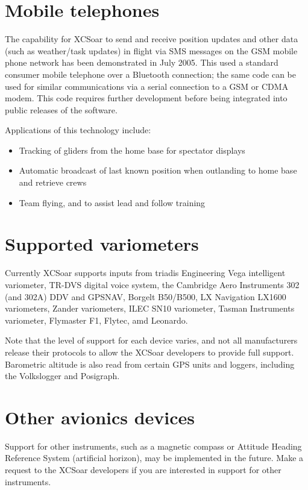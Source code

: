\documentclass[a4paper,12pt]{refrep}
\begin{document}
\section{Mobile telephones}

The capability for XCSoar to send and receive position updates and
other data (such as weather/task updates) in flight via SMS messages
on the GSM mobile phone network has been demonstrated in July 2005.
This used a standard consumer mobile telephone over a Bluetooth
connection; the same code can be used for similar communications via a
serial connection to a GSM or CDMA modem.  This code requires further
development before being integrated into public releases of the
software.

Applications of this technology include:
\begin{itemize}
\item Tracking of gliders from the home base for spectator displays
\item Automatic broadcast of last known position when outlanding
  to home base and retrieve crews
\item Team flying, and to assist lead and follow training
\end{itemize}

\section{Supported variometers}\label{sec:supported-varios}

Currently XCSoar supports inputs from triadis Engineering Vega intelligent
variometer, TR-DVS digital voice system, the Cambridge Aero Instruments 302 (and
302A) DDV and GPSNAV, Borgelt B50/B500, LX Navigation LX1600 variometers,
Zander variometers, ILEC SN10 variometer, Tasman Instruments variometer,
Flymaster F1, Flytec, amd Leonardo. 

Note that the level of support for each device varies, and not all manufacturers
release their protocols to allow the XCSoar developers to provide full support. 
Barometric altitude is also read from certain GPS units and loggers, including
the Volkslogger and Posigraph.

\section{Other avionics devices}

Support for other instruments, such as a magnetic compass or Attitude
Heading Reference System (artificial horizon), may be implemented in
the future.  Make a request to the XCSoar developers if you are
interested in support for other instruments.
\end{document}
